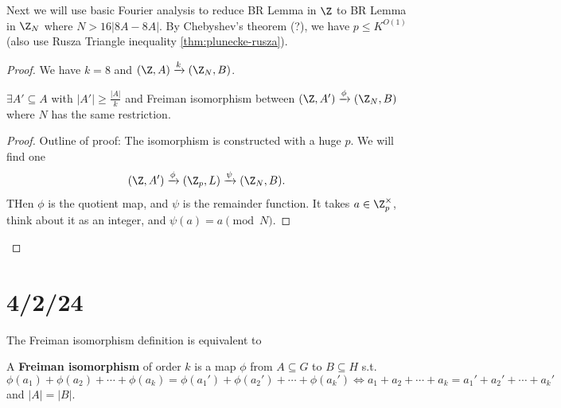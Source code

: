 \documentclass[a4paper]{article}
\begin{document}
Next we will use basic Fourier analysis to reduce BR Lemma in $\Z $ to BR Lemma in $\Z_N $ where $N > 16|8A-8A| $.
By Chebyshev's theorem (?), we have $p\le K^{O(1)}  $ (also use Rusza Triangle inequality \ref{thm:plunecke-rusza}).

\begin{proof}
	We have $k=8 $ and $(\Z,A) \xrightarrow{k} (\Z_N,B) $.
	\begin{lem}
		$\exists A' \subseteq A $ with $|A'| \ge \frac{|A|}{k} $ and Freiman isomorphism between $(\Z,A')\xrightarrow{\phi}(\Z_N,B) $ where $N $ has the same restriction.
	\end{lem}
	\begin{proof}
		Outline of proof:
		The isomorphism is constructed with a huge $p $.
		We will find one
		\[
			(\Z,A') \xrightarrow{\phi} (\Z_p,L)\xrightarrow{\psi} (\Z_N,B)
		.\]
		THen $\phi $ is the quotient map, and $\psi $ is the remainder function.
		It takes $a\in \Z_p^{\times}  $, think about it as an integer, and $\psi(a) = a\pmod{N} $.
	\end{proof}
\end{proof}

\section{4/2/24}

The Freiman isomorphism definition is equivalent to
\begin{definition}
	A \textbf{Freiman isomorphism} of order $k $ is a map $\phi $ from $A\subseteq G $ to $B \subseteq H $ s.t.
	\[
		\phi(a_{1}) + \phi(a_{2}) + \cdots + \phi(a_k) = \phi(a_{1}') + \phi(a_{2}') + \cdots + \phi(a_k') \iff a_{1}+a_{2}+\cdots+a_k = a_{1}'+a_{2}'+\cdots+a_k'
	\]
	and $|A| = |B| $.
\end{definition}
\end{document}
